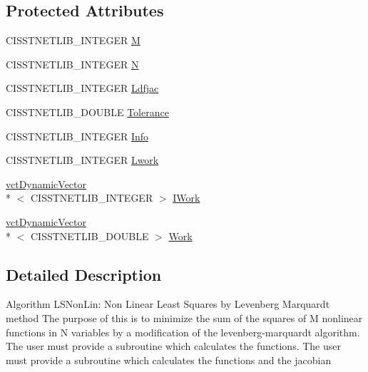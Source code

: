 \subsection*{Protected Attributes}
\begin{DoxyCompactItemize}
\item 
C\-I\-S\-S\-T\-N\-E\-T\-L\-I\-B\-\_\-\-I\-N\-T\-E\-G\-E\-R \hyperlink{classnmr_l_s_non_lin_jacobian_solver_a1d5bdcef6ad8ae1f9a7819c9a0c9d2db}{M}
\item 
C\-I\-S\-S\-T\-N\-E\-T\-L\-I\-B\-\_\-\-I\-N\-T\-E\-G\-E\-R \hyperlink{classnmr_l_s_non_lin_jacobian_solver_a50c6b56a17774e8eaaf37be19419f9b2}{N}
\item 
C\-I\-S\-S\-T\-N\-E\-T\-L\-I\-B\-\_\-\-I\-N\-T\-E\-G\-E\-R \hyperlink{classnmr_l_s_non_lin_jacobian_solver_a128aeda345f8579df433e9b34f4722a5}{Ldfjac}
\item 
C\-I\-S\-S\-T\-N\-E\-T\-L\-I\-B\-\_\-\-D\-O\-U\-B\-L\-E \hyperlink{classnmr_l_s_non_lin_jacobian_solver_ad2dd832ff0445b614dd62570e1b3c43d}{Tolerance}
\item 
C\-I\-S\-S\-T\-N\-E\-T\-L\-I\-B\-\_\-\-I\-N\-T\-E\-G\-E\-R \hyperlink{classnmr_l_s_non_lin_jacobian_solver_af1dcb7219deab0bfce93e95fa0fa71b1}{Info}
\item 
C\-I\-S\-S\-T\-N\-E\-T\-L\-I\-B\-\_\-\-I\-N\-T\-E\-G\-E\-R \hyperlink{classnmr_l_s_non_lin_jacobian_solver_a1fe3dba4bb43fa237bb23ee2f39b2e16}{Lwork}
\item 
\hyperlink{classvct_dynamic_vector}{vct\-Dynamic\-Vector}\\*
$<$ C\-I\-S\-S\-T\-N\-E\-T\-L\-I\-B\-\_\-\-I\-N\-T\-E\-G\-E\-R $>$ \hyperlink{classnmr_l_s_non_lin_jacobian_solver_a930eeb596c4ab9904652bc239879918f}{I\-Work}
\item 
\hyperlink{classvct_dynamic_vector}{vct\-Dynamic\-Vector}\\*
$<$ C\-I\-S\-S\-T\-N\-E\-T\-L\-I\-B\-\_\-\-D\-O\-U\-B\-L\-E $>$ \hyperlink{classnmr_l_s_non_lin_jacobian_solver_ac686feb241cffda475935e624c67d1bc}{Work}
\end{DoxyCompactItemize}


\subsection{Detailed Description}
Algorithm L\-S\-Non\-Lin\-: Non Linear Least Squares by Levenberg Marquardt method The purpose of this is to minimize the sum of the squares of M nonlinear functions in N variables by a modification of the levenberg-\/marquardt algorithm. The user must provide a subroutine which calculates the functions. The user must provide a subroutine which calculates the functions and the jacobian

